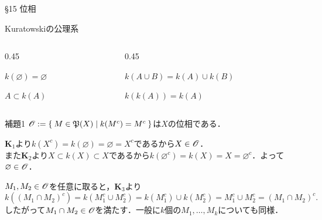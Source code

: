 \documentclass[uplatex,a4paper,dvipdfmx,aspectratio=169,11pt]{beamer}
\begin{document}
\newcommand{\Kbf}{\textbf{K}}
\begin{frame}[fragile]{\S 15 位相}
    \begin{block}{Kuratowskiの公理系}
        \vspace{-0.5em}
        \begin{columns}
            \begin{column}{0.45\textwidth}
                \begin{description}[$\textbf{K}_1$:]
                    \item[$\textbf{K}_1$:] $k(\varnothing) = \varnothing$
                    \item[$\textbf{K}_2$:] $A \subset k(A)$
                \end{description}
            \end{column}
            \begin{column}{0.45\textwidth}
                \begin{description}[$\textbf{K}_1$:]
                    \item[$\textbf{K}_3$:] $k(A \cup B) = k(A) \cup k(B)$
                    \item[$\textbf{K}_4$:] $k(k(A)) = k(A)$
                \end{description}
            \end{column}
        \end{columns}
    \end{block}

    \begin{block}{補題1}
        $\mathscr{O} := \Set{ M \in {\mathord{\mathfrak{P}}\qty(X)} | k(M^c) = M^c}$は$X$の位相である．
    \end{block}

    \medskip{}
    \begin{description}[$\textbf{O}_1$]
        \item[$\textbf{O}_1$:] $\Kbf_1$より$k(X^c) = k(\varnothing) = \varnothing = X^c$であるから$X \in \mathscr{O}$．\\
            また$\Kbf_2$より$X \subset k(X) \subset X$であるから$k(\varnothing^c) = k(X) = X = \varnothing^c$．よって$\varnothing \in \mathscr{O}$．
        \item[$\textbf{O}_2$:] $M_1, M_2 \in \mathscr{O}$を任意に取ると，$\Kbf_3$より
            \begin{equation*}
                k((M_1 \cap M_2)^c) = k(M_1^c \cup M_2^c) = k(M_1^c) \cup k(M_2^c) = M_1^c \cup M_2^c = (M_1 \cap M_2)^c.
            \end{equation*}
            したがって$M_1 \cap M_2 \in \mathscr{O}$を満たす．一般に$k$個の$M_1, \ldots, M_k$についても同様．
    \end{description}
\end{frame}
\end{document}
